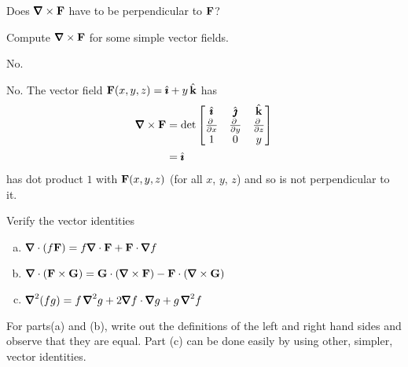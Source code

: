 \begin{question}
Does $\vnabla\times \vF$ have to be perpendicular to $\mathbf{F}$?
\end{question}

\begin{hint} 
Compute $\vnabla\times \vF$ for some simple vector fields.
\end{hint}

\begin{answer} 
No.
\end{answer}

\begin{solution} 
No.  The vector field $\mathbf{F}(x,y,z) = \hat{\pmb{\imath}} +y\,\hat{\mathbf{k}}$ has
\begin{align*}
\vnabla\times \vF
&=\det\left[\begin{matrix} \hi & \hj & \hk \\
                           \pdiff{}{x} & \pdiff{}{y} & \pdiff{}{z} \\
                           1 & 0 & y
            \end{matrix}\right] \\
&=\hi
\end{align*}
has dot product $1$ with $\mathbf{F}(x,y,z)$ (for all $x$, $y$, $z$) and
so is not perpendicular to it.
\end{solution}

\begin{question}\label{prb vector identity}
Verify the vector identities
\begin{enumerate}[(a)]
\item
$\vnabla\cdot(f\vF)=f\vnabla\cdot\vF+\vF\cdot\vnabla f$
\item
$\vnabla\cdot(\vF\times\vG)
                      =\vG\cdot(\vnabla\times\vF)-
                       \vF\cdot(\vnabla\times\vG)$
\item
$\vnabla^2(fg)=f\,\vnabla^2 g+2\vnabla f\cdot\vnabla g+g\,\vnabla^2 f$
\end{enumerate}

\end{question}

\begin{hint} 
For parts(a) and (b), write out the definitions of the left and right
hand sides and observe that they are equal.
Part (c) can be done easily by using other, simpler, vector identities.
\end{hint}

\begin{answer} 


\end{answer}

